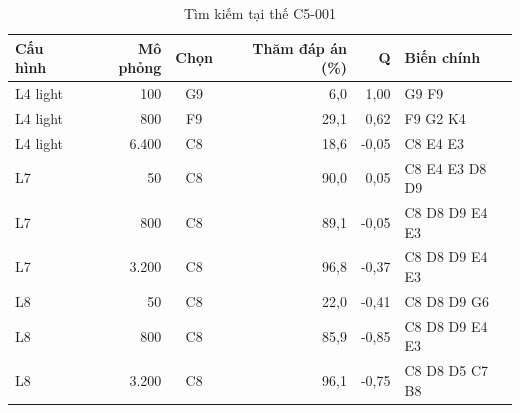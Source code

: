 \begin{table}[H]
  \centering
  \footnotesize
  \caption{Tìm kiếm tại thế C5-001}
  \label{tab:cs-tk-nhiet-c5-001}
  \begin{tabular}{lrcrrl}
    \toprule
    Cấu hình & Mô phỏng & Chọn & Thăm đáp án (\%) & Q & Biến chính \\
    \midrule
    L4 light & 100 & G9 & 6,0 & 1,00 & G9 F9 \\
    L4 light & 800 & F9 & 29,1 & 0,62 & F9 G2 K4 \\
    L4 light & 6.400 & C8 & 18,6 & -0,05 & C8 E4 E3 \\
    L7 & 50 & C8 & 90,0 & 0,05 & C8 E4 E3 D8 D9 \\
    L7 & 800 & C8 & 89,1 & -0,05 & C8 D8 D9 E4 E3 \\
    L7 & 3.200 & C8 & 96,8 & -0,37 & C8 D8 D9 E4 E3 \\
    L8 & 50 & C8 & 22,0 & -0,41 & C8 D8 D9 G6 \\
    L8 & 800 & C8 & 85,9 & -0,85 & C8 D8 D9 E4 E3 \\
    L8 & 3.200 & C8 & 96,1 & -0,75 & C8 D8 D5 C7 B8 \\
    \bottomrule
  \end{tabular}
\end{table}
